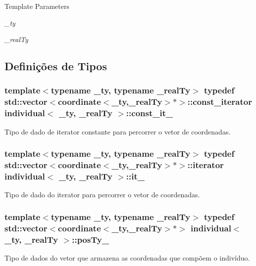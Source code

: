 \begin{DoxyTemplParams}{Template Parameters}
\item[{\em \_\-ty}]\item[{\em \_\-realTy}]\end{DoxyTemplParams}


\subsection{Definições de Tipos}
\hypertarget{classindividual_adcf0ed63de337fb1511eb795502f6e48}{
\subsubsection[{const\_\-it\_\-}]{\setlength{\rightskip}{0pt plus 5cm}template$<$typename \_\-ty, typename \_\-realTy$>$ typedef std::vector$<${\bf coordinate}$<$\_\-ty,\_\-realTy$>$$\ast$$>$::const\_\-iterator {\bf individual}$<$ \_\-ty, \_\-realTy $>$::{\bf const\_\-it\_\-}}}
\label{classindividual_adcf0ed63de337fb1511eb795502f6e48}
Tipo de dado de iterator constante para percorrer o vetor de coordenadas. \hypertarget{classindividual_a366746f769614c9cc31b42da59525c6b}{
\subsubsection[{it\_\-}]{\setlength{\rightskip}{0pt plus 5cm}template$<$typename \_\-ty, typename \_\-realTy$>$ typedef std::vector$<${\bf coordinate}$<$\_\-ty,\_\-realTy$>$$\ast$$>$::iterator {\bf individual}$<$ \_\-ty, \_\-realTy $>$::{\bf it\_\-}}}
\label{classindividual_a366746f769614c9cc31b42da59525c6b}
Tipo de dado do iterator para percorrer o vetor de coordenadas. \hypertarget{classindividual_a1e5daa9df67df2ce845387ea20c7111e}{
\subsubsection[{posTy\_\-}]{\setlength{\rightskip}{0pt plus 5cm}template$<$typename \_\-ty, typename \_\-realTy$>$ typedef std::vector$<${\bf coordinate}$<$\_\-ty,\_\-realTy$>$$\ast$$>$ {\bf individual}$<$ \_\-ty, \_\-realTy $>$::{\bf posTy\_\-}}}
\label{classindividual_a1e5daa9df67df2ce845387ea20c7111e}
Tipo de dados do vetor que armazena as coordenadas que compõem o indivíduo. 

